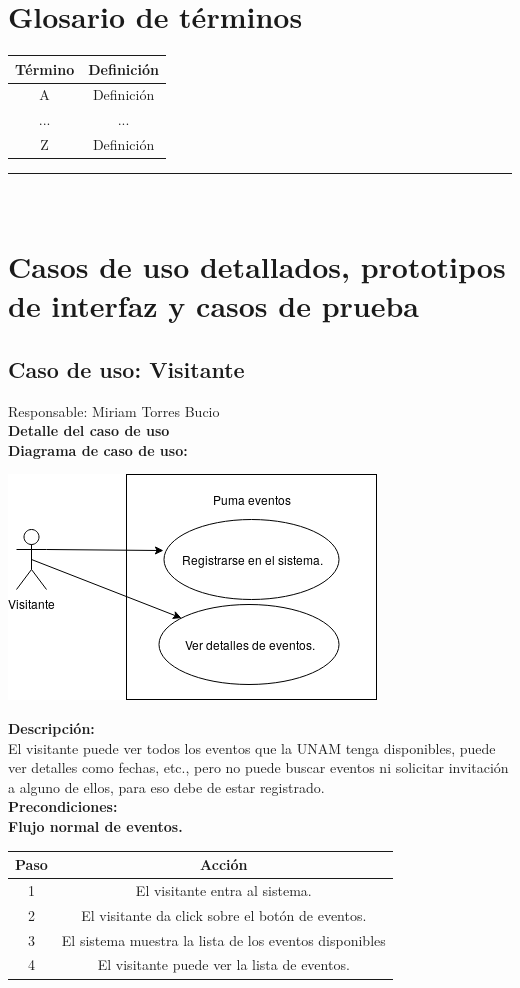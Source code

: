 \documentclass{article}
\newcommand{\newsubsection}[1]{
  \indent \textbf{#1}\\
}
\begin{document}
\section{Glosario de términos}
\begin{center}
  \begin{tabular}{| c | c |}
    \hline
    Término & Definición \\\hline
    A & Definición \\\hline
    ... & ... \\\hline
    Z & Definición \\\hline
  \end{tabular}
\end{center}
\rule{1\textwidth}{.8pt}\\

\section{Casos de uso detallados, prototipos de interfaz y casos de prueba}
\subsection{Caso de uso: Visitante}
Responsable: Miriam Torres Bucio\\
\newsubsection{Detalle del caso de uso}
\newsubsection{Diagrama de caso de uso:}
\begin{center}
  \includegraphics{../imagenes/casoUsoVisitante.png}
\end{center}

\newsubsection{Descripción:}
El visitante puede ver todos los eventos que la UNAM tenga disponibles, puede ver
detalles como fechas, etc., pero no puede buscar eventos ni solicitar invitación
a alguno de ellos, para eso debe de estar registrado.\\
\newsubsection{Precondiciones:}

\newsubsection{Flujo normal de eventos.}
\begin{center}
  \begin{tabular}{| c | c |}
    \hline
    Paso & Acción \\\hline
    1 & El visitante entra al sistema. \\\hline
    2 & El visitante da click sobre el bot\'on de eventos.\\\hline
    3 & El sistema muestra la lista de los eventos disponibles \\\hline
    4 & El visitante puede ver la lista de eventos.\\\hline
  \end{tabular}
\end{center}
\end{document}
